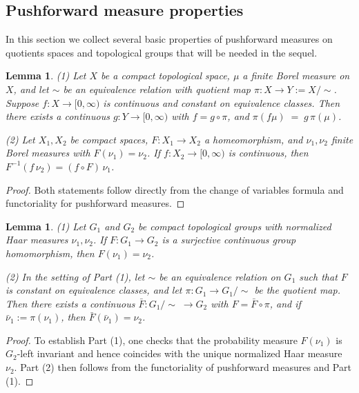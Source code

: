 \documentclass[11pt,reqno]{amsart}
\numberwithin{equation}{section}
\newtheorem{lemma}[theorem]{Lemma}
\theoremstyle{remark}
\theoremstyle{rmdefinition}
\begin{document}
\subsection{Pushforward measure properties}
In this section we collect several basic properties of pushforward measures on quotients spaces and topological groups that will be needed in the sequel.
\begin{lemma}\label{pushmequot} (1) Let \(X\) be a compact topological space, \(\mu\) a finite Borel measure on \(X\), and let \(\sim\) be an equivalence
	relation with quotient map \(\pi:X\to Y:=X/\!\sim\). Suppose \(f:X\to[0,\infty)\) is continuous
	and constant on equivalence classes. Then there exists a continuous  \(g:Y\to[0,\infty)\) with
	\(f=g\circ\pi\), and
	$\pi(f\mu) \;=\; g\,\pi(\mu)$.
		
	(2) Let \(X_1,X_2\) be compact spaces, \(F:X_1\to X_2\) a homeomorphism, and \(\nu_1,\nu_2\) finite Borel measures with
	\(F(\nu_1)=\nu_2\). If \(f:X_2\to[0,\infty)\) is continuous, then
	$
	F^{-1}(f\,\nu_2)=(f\circ F)\,\nu_1$.
	
\end{lemma}
\begin{proof}
Both statements follow directly from the change of variables formula and functoriality for pushforward measures.
\end{proof}

\begin{lemma}\label{pushmetopgruo} (1) Let \(G_1\) and \(G_2\) be compact topological groups with normalized Haar measures \(\nu_1,\nu_2\).
	If \(F:G_1\to G_2\) is a surjective continuous group homomorphism, then
	$F(\nu_1)=\nu_2$.
	
	(2) In the setting of Part (1), let \(\sim\) be an equivalence relation on \(G_1\) such that \(F\) is constant on equivalence classes,
	and let \(\pi:G_1\to G_1/\!\sim\) be the quotient map. Then there exists a continuous
	\(\bar F:G_1/\!\sim\;\to G_2\) with \(F=\bar F\circ\pi\), and if \(\bar\nu_1:=\pi(\nu_1)\), then $\bar F(\bar\nu_1)=\nu_2$.
\end{lemma}
\begin{proof}
To establish Part (1), one checks that the probability measure $F(\nu_1)$ is $G_2$-left invariant and hence coincides with the unique normalized Haar measure \(\nu_2\). Part (2) then follows from the functoriality of pushforward measures and Part (1).
\end{proof}
\end{document}
